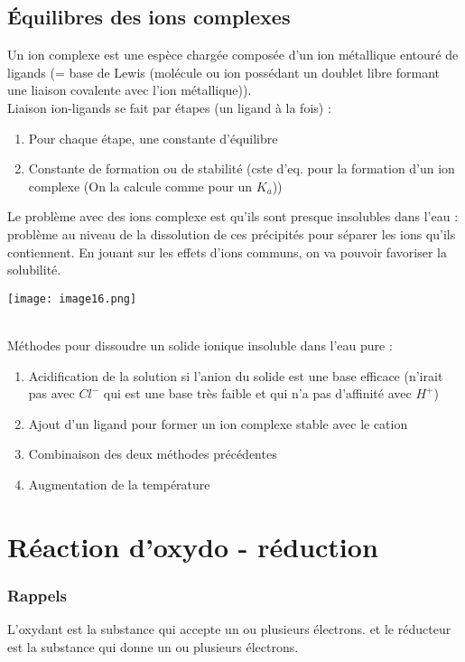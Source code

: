 \documentclass[british,french,11pt, a4paper, openany]{book}
\begin{document}
\section{Équilibres des ions complexes}
Un ion complexe est une espèce chargée composée d'un ion métallique entouré de ligands (= base de Lewis (molécule ou ion possédant un doublet libre formant une liaison covalente avec l'ion métallique)).\\
Liaison ion-ligands se fait par étapes (un ligand à la fois) :
\begin{enumerate}
	\item Pour chaque étape, une constante d'équilibre
	\item Constante de formation ou de stabilité (cste d'eq. pour la formation d'un ion complexe (On la calcule comme pour un $K_a$))
\end{enumerate}

Le problème avec des ions complexe est qu'ils sont presque insolubles dans l'eau : problème au niveau de la dissolution de ces précipités pour séparer les ions qu'ils contiennent. En jouant sur les effets d'ions communs, on va pouvoir favoriser la solubilité.
\begin{center}
	\texttt{[image: image16.png]}\\
\end{center}
\ \\
Méthodes pour dissoudre un solide ionique insoluble dans l'eau pure : 
\begin{enumerate}
	\item Acidification de la solution si l'anion du solide est une base efficace (n'irait pas avec $Cl^-$ qui est une base très faible et qui n'a pas d'affinité avec $H^+$)
	\item Ajout d'un ligand pour former un ion complexe stable avec le cation
	\item Combinaison des deux méthodes précédentes
	\item Augmentation de la température
\end{enumerate}

\newpage
\chapter{Réaction d'oxydo - réduction}
\subsection{Rappels}
L'oxydant est la substance qui accepte un ou plusieurs électrons. et le réducteur est la substance qui donne un ou plusieurs électrons.\\
\end{document}
